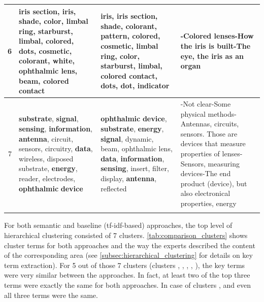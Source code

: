 \begin{longtable}[htbp]{|r|p{11.3em}|p{11.3em}|p{10em}|}
    \midrule
    6 & \textbf{iris} \textbf{section}, \textbf{iris}, \textbf{shade}, \textbf{color}, \textbf{limbal} \textbf{ring}, \textbf{starburst}, \textbf{limbal}, \textbf{colored}, \textbf{dots}, \textbf{cosmetic}, \textbf{colorant}, white, ophthalmic lens, beam, \textbf{colored} \textbf{contact} & \textbf{iris}, \textbf{iris} \textbf{section}, \textbf{shade}, \textbf{colorant}, pattern, \textbf{colored}, \textbf{cosmetic}, \textbf{limbal} \textbf{ring}, \textbf{color}, \textbf{starburst}, \textbf{limbal}, \textbf{colored} \textbf{contact}, \textbf{dots}, dot, indicator & -Colored lenses\newline{}-How the iris is built\newline{}-The eye, the iris as an organ \\
    \midrule
    7 & \textbf{substrate}, \textbf{signal}, \textbf{sensing}, \textbf{information}, \textbf{antenna}, circuit, sensors, circuitry, \textbf{data}, wireless, disposed substrate, \textbf{energy}, reader, electrodes, \textbf{ophthalmic} \textbf{device} & \textbf{ophthalmic} \textbf{device}, \textbf{substrate}, \textbf{energy}, \textbf{signal}, dynamic, beam, ophthalmic lens, \textbf{data}, \textbf{information}, \textbf{sensing}, insert, filter, display, \textbf{antenna}, reflected & -Not clear\newline{}-Some physical methods\newline{}-Antennas, circuits, sensors. Those are devices that measure properties of lenses\newline{}-Sensors, measuring devices\newline{}-The end product (device), but also electronical properties, energy \\
  \label{tab:comparison_clusters}%
\end{longtable}%

For both semantic and baseline (\gls{tf-idf}-based) approaches, the top level of hierarchical clustering consisted of 7 clusters.
\autoref{tab:comparison_clusters} shows cluster terms for both approaches and the way the experts described the content of the corresponding area (see \autoref{subsec:hierarchical_clustering} for details on key term extraction).
For 5 out of those 7 clusters (clusters , , , , ), the key terms were very similar between the approaches.
In fact, at least two of the top three terms were exactly the same for both approaches.
In case of clusters ,  and  even all three terms were the same.

